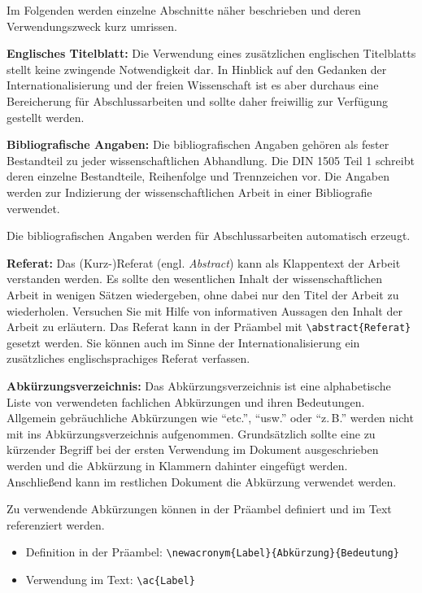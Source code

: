 Im Folgenden werden einzelne Abschnitte näher beschrieben und deren Verwendungszweck kurz umrissen.
	
\textbf{Englisches Titelblatt:}\label{itm:englishTitle}
Die Verwendung eines zusätzlichen englischen Titelblatts stellt keine zwingende Notwendigkeit dar. In Hinblick auf den Gedanken der Internationalisierung und der freien Wissenschaft ist es aber durchaus eine Bereicherung für Abschlussarbeiten und sollte daher freiwillig zur Verfügung gestellt werden.
	
\textbf{Bibliografische Angaben:}\label{itm:bibliographicData}
Die bibliografischen Angaben gehören als fester Bestandteil zu jeder wissenschaftlichen Abhandlung. Die DIN 1505 Teil 1 schreibt deren einzelne Bestandteile, Reihenfolge und Trennzeichen vor. Die Angaben werden zur Indizierung der wissenschaftlichen Arbeit in einer Bibliografie verwendet. 

Die bibliografischen Angaben werden für Abschlussarbeiten automatisch erzeugt.
	
\textbf{Referat:}\label{itm:abstract}
Das (Kurz-)Referat (engl. \textit{Abstract}) kann als Klappentext der Arbeit verstanden werden. Es sollte den wesentlichen Inhalt der wissenschaftlichen Arbeit in wenigen Sätzen wiedergeben, ohne dabei nur den Titel der Arbeit zu wiederholen. Versuchen Sie mit Hilfe von informativen Aussagen den Inhalt der Arbeit zu erläutern. Das Referat kann in der Präambel mit \verb|\abstract{Referat}| gesetzt werden. Sie können auch im Sinne der Internationalisierung ein zusätzliches englischsprachiges Referat verfassen.
	
\textbf{Abkürzungsverzeichnis:}\label{itm:acronyms}
Das Abkürzungsverzeichnis ist eine alphabetische Liste von verwendeten fachlichen Abkürzungen und ihren Bedeutungen. Allgemein gebräuchliche Abkürzungen wie \enquote{etc.}, \enquote{usw.} oder \enquote{z.\,B.} werden nicht mit ins Abkürzungsverzeichnis aufgenommen. Grundsätzlich sollte eine zu kürzender Begriff bei der ersten Verwendung im Dokument ausgeschrieben werden und die Abkürzung in Klammern dahinter eingefügt werden. Anschließend kann im restlichen Dokument die Abkürzung verwendet werden. 

Zu verwendende Abkürzungen können in der Präambel definiert und im Text referenziert werden.
\begin{itemize}
	\item Definition in der Präambel: \verb|\newacronym{Label}{Abkürzung}{Bedeutung}|
	\item Verwendung im Text: \verb|\ac{Label}|
\end{itemize}
	
